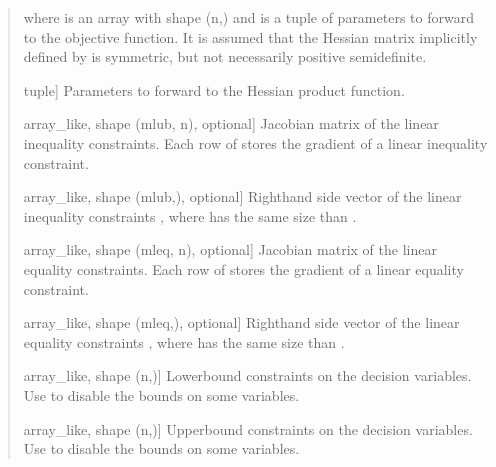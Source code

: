 \documentclass[letterpaper,10pt,english]{sphinxmanual}
\begin{document}
\begin{fulllineitems}
\begin{quote}
\begin{description}
\begin{description}
\begin{quote}
\sphinxAtStartPar
{}
\end{quote}

\sphinxAtStartPar
where  is an array with shape (n,) and  is a tuple of
parameters to forward to the objective function. It is assumed that the
Hessian matrix implicitly defined by  is symmetric, but not
necessarily positive semidefinite.

\item[{\sphinxstylestrong{args}}] \leavevmode{[}tuple{]}
\sphinxAtStartPar
Parameters to forward to the Hessian product function.

\item[{\sphinxstylestrong{Aub}}] \leavevmode{[}array\_like, shape (mlub, n), optional{]}
\sphinxAtStartPar
Jacobian matrix of the linear inequality constraints. Each row of 
stores the gradient of a linear inequality constraint.

\item[{\sphinxstylestrong{bub}}] \leavevmode{[}array\_like, shape (mlub,), optional{]}
\sphinxAtStartPar
Right\sphinxhyphen{}hand side vector of the linear inequality constraints
, where  has the same size than .

\item[{\sphinxstylestrong{Aeq}}] \leavevmode{[}array\_like, shape (mleq, n), optional{]}
\sphinxAtStartPar
Jacobian matrix of the linear equality constraints. Each row of 
stores the gradient of a linear equality constraint.

\item[{\sphinxstylestrong{beq}}] \leavevmode{[}array\_like, shape (mleq,), optional{]}
\sphinxAtStartPar
Right\sphinxhyphen{}hand side vector of the linear equality constraints
, where  has the same size than .

\item[{\sphinxstylestrong{xl}}] \leavevmode{[}array\_like, shape (n,){]}
\sphinxAtStartPar
Lower\sphinxhyphen{}bound constraints on the decision variables. Use  to
disable the bounds on some variables.

\item[{\sphinxstylestrong{xu}}] \leavevmode{[}array\_like, shape (n,){]}
\sphinxAtStartPar
Upper\sphinxhyphen{}bound constraints on the decision variables. Use  to
disable the bounds on some variables.


\end{description}
\end{description}
\end{quote}
\end{fulllineitems}
\end{document}
